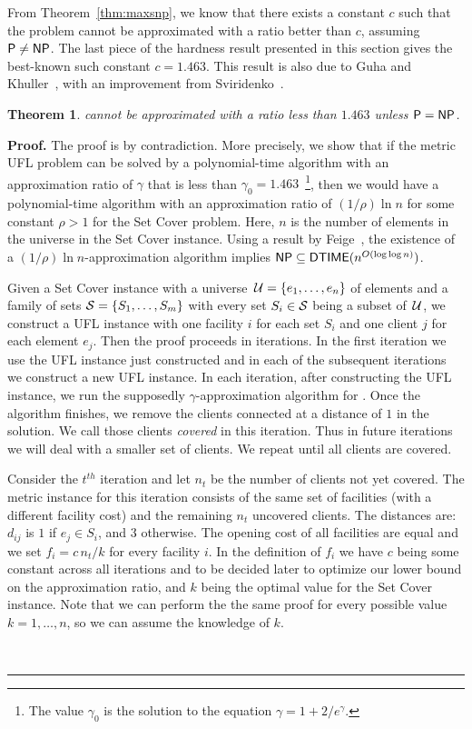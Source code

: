 \documentclass[oneside,final]{ucr}
\newtheorem{theorem}{Theorem}
\newenvironment{proof}[1][Proof]{\textbf{#1.} }{\ \rule{0.5em}{0.5em}}
\begin{document}
From Theorem~\ref{thm:maxsnp}, we know that there exists a
constant $c$ such that the {\UFL} problem cannot be
approximated with a ratio better than $c$, assuming ${\mbox{\sf P}}
\neq {\mbox{\sf NP}}$. The last piece of the hardness result presented
in this section gives the best-known such constant
$c=1.463$. This result is also due to Guha and
Khuller~\cite{GuhaK98}, with an improvement from
Sviridenko~\cite{Vygen05}.
\begin{theorem}\label{thm:1463} \cite{GuhaK98,Vygen05}
  {\UFL} cannot be approximated with a ratio less than
  $1.463$ unless ${\mbox{\sf P}} = {\mbox{\sf NP}}$.
\end{theorem}
\begin{proof}
  The proof is by contradiction. More precisely, we show
  that if the metric UFL problem can be solved by a
  polynomial-time algorithm with an approximation ratio of
  $\gamma$ that is less than $\gamma_0 =
  1.463$~\footnote{The value $\gamma_0$ is the solution to
    the equation $\gamma = 1 + 2/e^\gamma$.}, then we would
  have a polynomial-time algorithm with an approximation
  ratio of $(1/\rho) \ln n$ for some constant $\rho > 1$ for
  the Set Cover problem. Here, $n$ is the number of elements
  in the universe in the Set Cover instance. Using a result
  by Feige~\cite{Feige98}, the existence of a $(1/\rho) \ln
  n$-approximation algorithm implies ${\mbox{\sf NP}} \subseteq
  {\mbox{\sf DTIME}}(n^{O(\log\log n)})$.

  Given a Set Cover instance with a universe $\,\calU =
  \{e_1,\ldots,e_n\}$ of elements and a family of sets
  $\calS = \{S_1,\ldots,S_m\}$ with every set $S_i \in
  \calS$ being a subset of $\,\calU$, we construct a UFL
  instance with one facility $i$ for each set $S_i$ and one
  client $j$ for each element $e_j$. Then the proof proceeds
  in iterations. In the first iteration we use the UFL
  instance just constructed and in each of the subsequent
  iterations we construct a new UFL instance. In each
  iteration, after constructing the UFL instance, we 
  run the supposedly $\gamma$-approximation algorithm for
  {\UFL}. Once the {\UFL} algorithm finishes, we remove the
  clients connected at a distance of $1$ in the {\UFL}
  solution. We call those clients \emph{covered} in this
  iteration. Thus in future iterations we will deal with a
  smaller set of clients. We repeat until all clients are
  covered.

  Consider the $t^{th}$ iteration and let $n_t$ be the
  number of clients not yet covered. The metric {\UFL}
  instance for this iteration consists of the same set of
  facilities (with a different facility cost) and the
  remaining $n_t$ uncovered clients. The distances are:
  $d_{ij}$ is $1$ if $e_j \in S_i$, and $3$ otherwise. The
  opening cost of all facilities are equal and we set $f_i =
  c\,n_t / k$ for every facility $i$. In the definition of
  $f_i$ we have $c$ being some constant across all
  iterations and to be decided later to optimize our lower
  bound on the approximation ratio, and $k$ being the
  optimal value for the Set Cover instance.  Note that we
  can perform the the same proof for every possible value
  $k=1,\ldots,n$, so we can assume the knowledge of $k$.


\end{proof}
\end{document}
